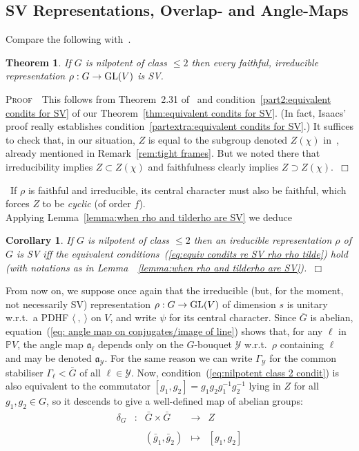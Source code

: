 \documentclass[12pt]{article}
\newtheorem{cor}{Corollary}[section]
\newtheorem{thm}{Theorem}[section]
\newcommand{\bbP}{\ensuremath{\mathbb{P}}}
\newcommand{\bPf}{\noindent \textsc{Proof\ }}
\newcommand{\cY}{\ensuremath{\mathcal{Y}}}
\newcommand{\displaymapdef}[5]
{
	\begin{array}{rcrcl}
		#1 &:& #2 &\longrightarrow& #3 \\
		& &    &                    \\
		& & #4 &\longmapsto    & #5
	\end{array}
}
\newcommand{\ePf}{~$\Box$\vertsp\par}%
\newcommand{\fa}{\ensuremath{\mathfrak{a}}}
\newcommand{\GL}{{\rm GL}}
\newcommand{\inv}{^{-1}}%
\renewcommand{\rem}{\refstepcounter{rem}\noindent{\sc Remark \therem}}
\renewcommand{\therem}{\thesection.\arabic{rem}}
\newcommand{\vertsp}{\vspace{1ex}}
\newcommand{\barg}{\ensuremath{\bar{g}}}
\newcommand{\barG}{\ensuremath{\bar{G}}}
\begin{document}
\subsection{SV Representations, Overlap- and Angle-Maps}   
Compare the following with~\cite[Theorem 13.5]{Waldron's book}.
\begin{thm}\label{thm:SV for class 2 nilpotent groups} 
If $G$ is nilpotent of class $\leq 2$ then every faithful, irreducible  representation $\rho: G \rightarrow \GL(V)$ is SV.
\end{thm}
\bPf\ This follows from Theorem~2.31 of~\cite{Isaacs} and  condition~\ref{part2:equivalent condits for SV} of our Theorem~\ref{thm:equivalent condits for SV}. (In fact, Isaacs' proof really establishes condition~\ref{partextra:equivalent condits for SV}.) It suffices to check that, in our situation, $Z$ is equal to the subgroup denoted $Z(\chi)$ in~\cite{Isaacs}, already mentioned in Remark~\ref{rem:tight frames}. But we noted there that irreducibility implies $Z\subset Z(\chi)$ and faithfulness clearly implies $Z\supset Z(\chi)$.\ePf
\rem\ If $\rho$ is faithful and irreducible, its central character must also be faithful, which forces $Z$ to be \textit{cyclic} (of order $f$).\bigskip\\
Applying Lemma~\ref{lemma:when rho and tilderho are SV} we deduce 
\begin{cor}
	If $G$ is nilpotent of class $\leq 2$ then an ireducible representation $\rho$ of $G$ is SV iff the equivalent conditions~(\ref{eq:equiv condits re SV rho rho tilde}) hold (with notations as in Lemma~~\ref{lemma:when rho and tilderho are SV}).\ePf 
\end{cor}
From now on, we suppose once again that the irreducible (but, for the moment, not necessarily SV) representation $\rho:G\rightarrow \GL(V)$   of dimension $s$ is unitary w.r.t.\ a PDHF $\langle\ ,\ \rangle$ on $V$, and write $\psi$ for its central character. Since $\bar G$ is abelian, equation~(\ref{eq: angle map on conjugates/image of line}) shows that, for any $\ell$ in $\bbP V$, the angle map $\fa_\ell$ depends only on the $G$-bouquet $\cY$ w.r.t.\ $\rho$ containing $\ell$ and may be denoted $\fa_\cY$. For the same reason we can write $\Gamma_\cY$ for the common stabiliser $\Gamma_{\ell}<\bar{G}$ of all $\ell\in\cY$. Now, condition~(\ref{eq:nilpotent class 2 condit}) is also  equivalent to the commutator $[g_1,g_2]=g_1g_2g_1\inv g_2\inv$ lying in $Z$ for all $g_1,g_2\in G$, so it descends to give a well-defined map of abelian groups: 
\begin{equation}\label{eq:def of deltaG for any G class 2 nilp}
	\displaymapdef{\delta_G}{\barG \times \barG}{Z}{(\barg_1,\barg_2)}{[g_1,g_2]}
\end{equation}
\end{document}
